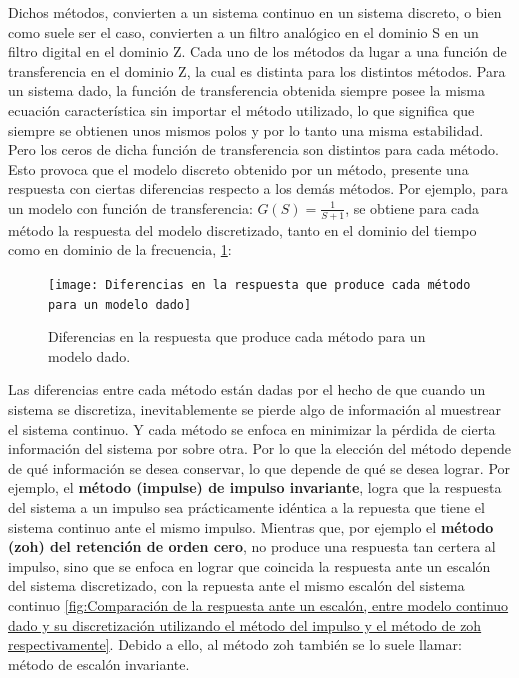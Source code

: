 \documentclass{article}
\begin{document}
\begin{sloppypar}
Dichos métodos, convierten a un sistema continuo en un sistema discreto, o bien como suele ser el caso, convierten a un filtro analógico en el dominio S en un filtro digital en el dominio Z.
Cada uno de los métodos da lugar a una función de transferencia en el dominio Z, la cual es distinta para los distintos métodos. Para un sistema dado, la función de transferencia obtenida siempre posee la misma ecuación característica sin importar el método utilizado, lo que significa que siempre se obtienen unos mismos polos y por lo tanto una misma estabilidad. Pero los ceros de dicha función de transferencia son distintos para cada método. Esto provoca que el modelo discreto obtenido por un método, presente una respuesta con ciertas diferencias respecto a los demás métodos. Por ejemplo, para un modelo con función de transferencia: $G(S)=\frac{1}{S+1}$, se obtiene para cada método la respuesta del modelo discretizado, tanto en el dominio del tiempo como en dominio de la frecuencia, \ref{fig:Diferencias en la respuesta que produce cada método para un modelo dado}:

\begin{figure}[H]
    \centering
    \texttt{[image: Diferencias en la respuesta que produce cada método para un modelo dado]}
    \caption{Diferencias en la respuesta que produce cada método para un modelo dado.}
    \label{fig:Diferencias en la respuesta que produce cada método para un modelo dado}
\end{figure}

Las diferencias entre cada método están dadas por el hecho de que cuando un sistema se discretiza, inevitablemente se pierde algo de información al muestrear el sistema continuo. Y cada método se enfoca en minimizar la pérdida de cierta información del sistema por sobre otra. Por lo que la elección del método depende de qué información se desea conservar, lo que depende de qué se desea lograr.
Por ejemplo, el \textbf{método (impulse) de impulso invariante}, logra que la respuesta del sistema a un impulso sea prácticamente idéntica a la repuesta que tiene el sistema continuo ante el mismo impulso. Mientras que, por ejemplo el \textbf{método (zoh) del retención de orden cero}, no produce una respuesta tan certera al impulso, sino que se enfoca en lograr que coincida la respuesta ante un escalón del sistema discretizado, con la repuesta ante el mismo escalón del sistema continuo \ref{fig:Comparación de la respuesta ante un escalón, entre modelo continuo dado y su discretización utilizando el método del impulso y el método de zoh respectivamente}. Debido a ello, al método zoh también se lo suele llamar: método de escalón invariante.


\end{sloppypar}
\end{document}
